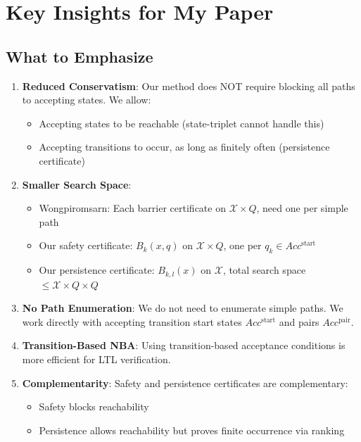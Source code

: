 \documentclass{article}
\begin{document}
\section{Key Insights for My Paper}

\subsection{What to Emphasize}

\begin{enumerate}
    \item \textbf{Reduced Conservatism}: Our method does NOT require blocking all paths to accepting states. We allow:
    \begin{itemize}
        \item Accepting states to be reachable (state-triplet cannot handle this)
        \item Accepting transitions to occur, as long as finitely often (persistence certificate)
    \end{itemize}

    \item \textbf{Smaller Search Space}:
    \begin{itemize}
        \item Wongpiromsarn: Each barrier certificate on $\mathcal{X} \times Q$, need one per simple path
        \item Our safety certificate: $B_k(x,q)$ on $\mathcal{X} \times Q$, one per $q_k \in Acc^{\text{start}}$
        \item Our persistence certificate: $B_{k,l}(x)$ on $\mathcal{X}$, total search space $\leq \mathcal{X} \times Q \times Q$
    \end{itemize}

    \item \textbf{No Path Enumeration}: We do not need to enumerate simple paths. We work directly with accepting transition start states $Acc^{\text{start}}$ and pairs $Acc^{\text{pair}}$.

    \item \textbf{Transition-Based NBA}: Using transition-based acceptance conditions is more efficient for LTL verification.

    \item \textbf{Complementarity}: Safety and persistence certificates are complementary:
    \begin{itemize}
        \item Safety blocks reachability
        \item Persistence allows reachability but proves finite occurrence via ranking
    \end{itemize}
\end{enumerate}
\end{document}
